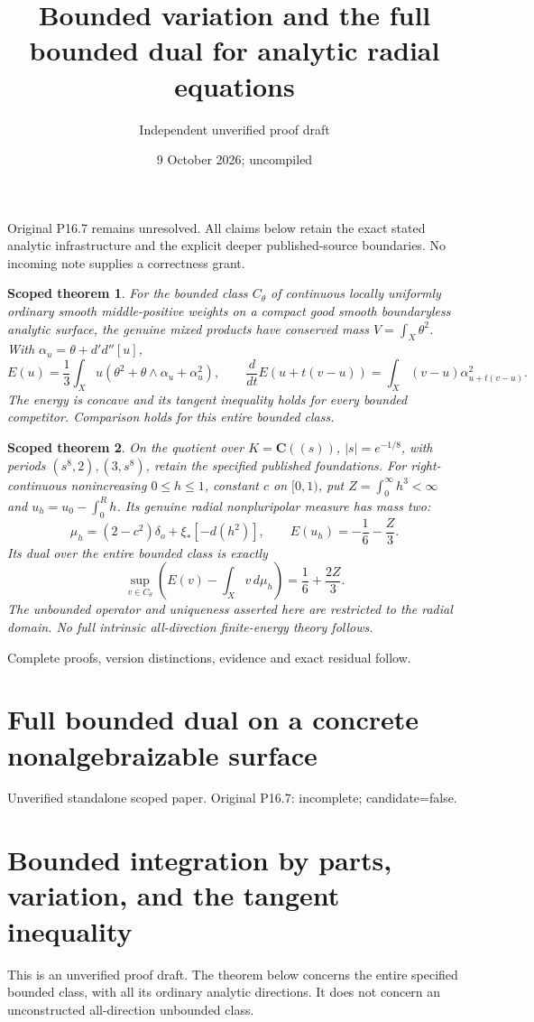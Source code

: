 \documentclass[11pt]{article}
\title{Bounded variation and the full bounded dual for analytic radial equations}
\author{Independent unverified proof draft}
\date{9 October 2026; uncompiled}
\newtheorem{theorem}{Scoped theorem}
\begin{document}
\maketitle
Original P16.7 remains unresolved. All claims below retain the exact stated
analytic infrastructure and the explicit deeper published-source boundaries.
No incoming note supplies a correctness grant.
\begin{theorem}
For the bounded class $C_\theta$ of continuous locally uniformly ordinary
smooth middle-positive weights on a compact good smooth boundaryless analytic
surface, the genuine mixed products have conserved mass
$V=\int_X\theta^2$. With $\alpha_u=\theta+d'd''[u]$,
\[
 E(u)=\frac13\int_Xu(\theta^2+\theta\wedge\alpha_u+\alpha_u^2),
 \qquad \frac{d}{dt}E(u+t(v-u))=\int_X(v-u)\alpha_{u+t(v-u)}^2.
\]
The energy is concave and its tangent inequality holds for every bounded
competitor. Comparison holds for this entire bounded class.
\end{theorem}
\begin{theorem}
On the quotient over $K=\mathbf C((s))$, $|s|=e^{-1/8}$, with periods
$(s^8,2),(3,s^8)$, retain the specified published foundations. For
right-continuous nonincreasing $0\le h\le1$, constant $c$ on $[0,1)$,
put $Z=\int_0^\infty h^3<\infty$ and
$u_h=u_0-\int_0^{R}h$. Its genuine radial nonpluripolar measure has mass two:
\[
 \mu_h=(2-c^2)\delta_o+\xi_*[-d(h^2)],\qquad
 E(u_h)=-\frac16-\frac Z3.
\]
Its dual over the entire bounded class is exactly
\[
 \sup_{v\in C_\theta}\left(E(v)-\int_Xv\,d\mu_h\right)
 =\frac16+\frac{2Z}{3}.
\]
The unbounded operator and uniqueness asserted here are restricted to the
radial domain. No full intrinsic all-direction finite-energy theory follows.
\end{theorem}
Complete proofs, version distinctions, evidence and exact residual follow.

\section*{Full bounded dual on a concrete nonalgebraizable surface}

Unverified standalone scoped paper. Original P16.7: incomplete; candidate=false.

\section*{Bounded integration by parts, variation, and the tangent inequality}

This is an unverified proof draft. The theorem below concerns the entire specified bounded class, with all its ordinary analytic directions. It does not concern an unconstructed all-direction unbounded class.
\end{document}
